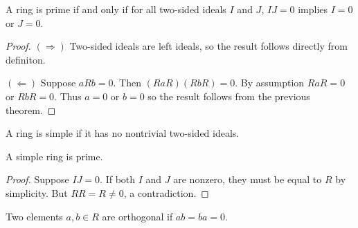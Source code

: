 \begin{theorem}
  \label{thm:prime_ring_equiv'}
  \leanok
  A ring is prime if and only if for all two-sided ideals $I$ and $J$, $IJ = 0$ implies $I = 0$ or $J = 0$.
\end{theorem}
\begin{proof}
  \leanok
  $(\Rightarrow)$ Two-sided ideals are left ideals, so the result follows directly from definiton.

  $(\Leftarrow)$ Suppose $aRb = 0$. Then $(RaR)(RbR) = 0$. By assumption $RaR = 0$ or $RbR = 0$. Thus $a = 0$ or $b = 0$ so the result follows from the previous theorem.
\end{proof}

\begin{definition}
  \label{def:IsSimpleRing}
  \leanok %
  A ring is simple if it has no nontrivial two-sided ideals.
\end{definition}

\begin{theorem}
  \label{thm:simple_ring_is_prime}
  \leanok
  A simple ring is prime.
\end{theorem}
\begin{proof}
  \leanok
  Suppose $IJ = 0$. If both $I$ and $J$ are nonzero, they must be equal to $R$ by simplicity. But $RR = R \neq 0$, a contradiction.
\end{proof}

\begin{definition}
  \label{def:IsOrthogonal}
  \leanok %
  Two elements $a, b \in R$ are orthogonal if $ab = ba = 0$.
\end{definition}

